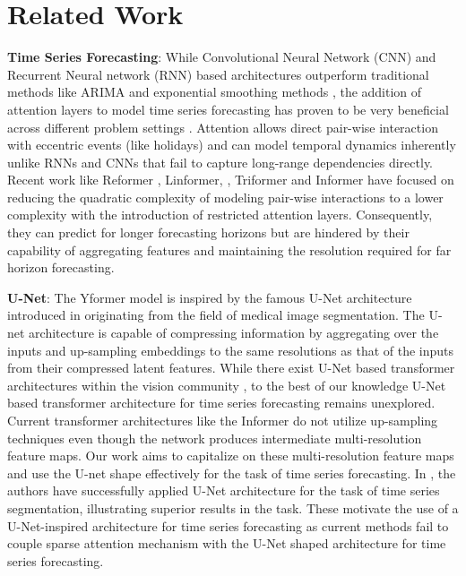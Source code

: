 \section{Related Work}

\textbf{Time Series Forecasting}: While Convolutional Neural Network (CNN) and Recurrent Neural network (RNN) based architectures \cite{RangapuramDeepState,salinas2020deepar} outperform traditional methods like ARIMA \cite{BoxArima} and exponential smoothing methods \cite{hyndman2018forecasting}, the addition of attention layers \cite{vaswani2017attention} to model time series forecasting has proven to be very beneficial across different problem settings \cite{10.1145/3292500.3330662,lai2018modeling,qin2017dual,wu2021autoformer}. Attention allows direct pair-wise interaction with eccentric events (like holidays) and can model temporal dynamics inherently unlike RNNs and CNNs that fail to capture long-range dependencies directly. Recent work like Reformer \cite{kitaev2020reformer}, Linformer, \cite{wang2020linformer}, Triformer \cite{cirstea2022triformer} and Informer \cite{zhou2020informer} have focused on reducing the quadratic complexity of modeling pair-wise interactions to a lower complexity with the introduction of restricted attention layers. Consequently, they can predict for longer forecasting horizons but are hindered by their capability of aggregating features and maintaining the resolution required for far horizon forecasting. 

\textbf{U-Net}: The Yformer model is inspired by the famous U-Net architecture introduced in \cite{ronneberger2015u} originating from the field of medical image segmentation. The U-net architecture is capable of compressing information by aggregating over the inputs and up-sampling embeddings to the same resolutions as that of the inputs from their compressed latent features. While there exist U-Net based transformer architectures within the vision community \cite{petit2021u,zhou2021nnformer}, to the best of our knowledge U-Net based transformer architecture for time series forecasting remains unexplored. Current transformer architectures like the Informer \cite{zhou2020informer} do not utilize up-sampling techniques even though the network produces intermediate multi-resolution feature maps. Our work aims to capitalize on these multi-resolution feature maps and use the U-net shape effectively for the task of time series forecasting. In \cite{perslev2019u}, the authors have successfully applied U-Net architecture for the task of time series segmentation, illustrating superior results in the task. These motivate the use of a U-Net-inspired architecture for time series forecasting as current methods fail to couple sparse attention mechanism with the U-Net shaped architecture for time series forecasting.

